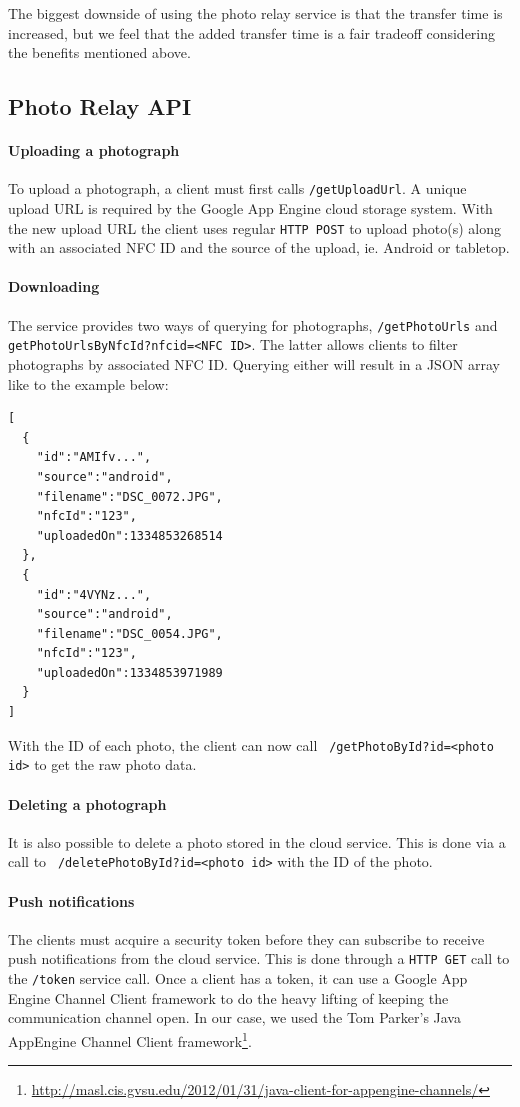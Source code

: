 \documentclass{article}
\begin{document}
The biggest downside of using the photo relay service is that the transfer time is increased, but we feel that the added transfer time is a fair tradeoff considering the benefits mentioned above.

\subsection{Photo Relay API}
 
\paragraph{Uploading a photograph}
To upload a photograph, a client must first calls \lstinline{/getUploadUrl}. A unique upload URL is required by the Google App Engine cloud storage system. With the new upload URL the client uses regular \lstinline{HTTP POST} to upload photo(s) along with an associated NFC ID and the source of the upload, ie. Android or tabletop.
 
\paragraph{Downloading}
The service provides two ways of querying for photographs, \lstinline{/getPhotoUrls} and \lstinline{getPhotoUrlsByNfcId?nfcid=<NFC ID>}. The latter allows clients to filter photographs by associated NFC ID. Querying either will result in a JSON array like to the example below:
 
\begin{lstlisting}
[
  {
  	"id":"AMIfv...",
    "source":"android",
    "filename":"DSC_0072.JPG",
    "nfcId":"123",
    "uploadedOn":1334853268514
  },
  {
    "id":"4VYNz...",
    "source":"android",
    "filename":"DSC_0054.JPG",
    "nfcId":"123",
    "uploadedOn":1334853971989
  }
]
\end{lstlisting}
 
With the ID of each photo, the client can now call \lstinline{ /getPhotoById?id=<photo id>} to get the raw photo data.
 
\paragraph{Deleting a photograph}
It is also possible to delete a photo stored in the cloud service. This is done via a call to \lstinline{ /deletePhotoById?id=<photo id>} with the ID of the photo.
 
\paragraph{Push notifications}
The clients must acquire a security token before they can subscribe to receive push notifications from the cloud service. This is done through a \lstinline{HTTP GET} call to the \lstinline{/token} service call. Once a client has a token, it can use a Google App Engine Channel Client framework to do the heavy lifting of keeping the communication channel open. In our case, we used the Tom Parker's Java AppEngine Channel Client framework\footnote{\url{http://masl.cis.gvsu.edu/2012/01/31/java-client-for-appengine-channels/}}.
 
\end{document}
